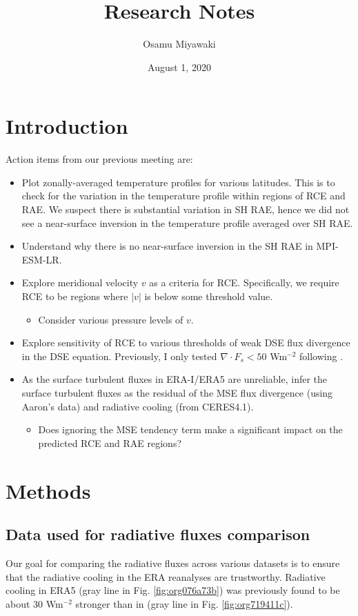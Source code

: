 \documentclass[11pt]{article}
\author{Osamu Miyawaki}
\date{August 1, 2020}
\title{Research Notes}
\begin{document}
\maketitle

\section{Introduction}
\label{sec:orgb5ececc}
Action items from our previous meeting are:
\begin{itemize}
\item Plot zonally-averaged temperature profiles for various latitudes. This is to check for the variation in the temperature profile within regions of RCE and RAE. We suspect there is substantial variation in SH RAE, hence we did not see a near-surface inversion in the temperature profile averaged over SH RAE.
\item Understand why there is no near-surface inversion in the SH RAE in MPI-ESM-LR.
\item Explore meridional velocity \(v\) as a criteria for RCE. Specifically, we require RCE to be regions where \(|v|\) is below some threshold value.
\begin{itemize}
\item Consider various pressure levels of \(v\).
\end{itemize}
\item Explore sensitivity of RCE to various thresholds of weak DSE flux divergence in the DSE equation. Previously, I only tested \(\nabla\cdot F_s<50\) Wm\(^{-2}\) following \cite{jakob_radiative_2019}.
\item As the surface turbulent fluxes in ERA-I/ERA5 are unreliable, infer the surface turbulent fluxes as the residual of the MSE flux divergence (using Aaron's data) and radiative cooling (from CERES4.1).
\begin{itemize}
\item Does ignoring the MSE tendency term make a significant impact on the predicted RCE and RAE regions?
\end{itemize}
\end{itemize}

\section{Methods}
\label{sec:orgaf98902}
\subsection{Data used for radiative fluxes comparison}
\label{sec:org63e75b4}
Our goal for comparing the radiative fluxes across various datasets is to ensure that the radiative cooling in the ERA reanalyses are trustworthy. Radiative cooling in ERA5 (gray line in Fig. \ref{fig:org076a73b}) was previously found to be about 30 Wm\(^{-2}\) stronger than in \cite{hartmann_global_2016} (gray line in Fig. \ref{fig:org719411c}).
\end{document}
